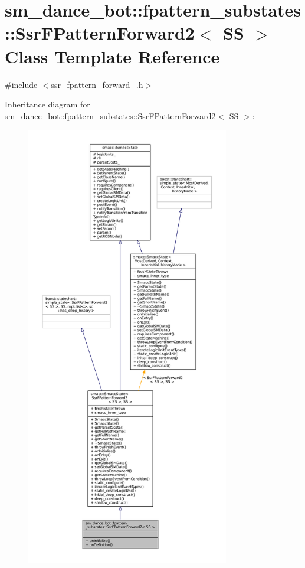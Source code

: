 \hypertarget{structsm__dance__bot_1_1fpattern__substates_1_1SsrFPatternForward2}{}\section{sm\+\_\+dance\+\_\+bot\+:\+:fpattern\+\_\+substates\+:\+:Ssr\+F\+Pattern\+Forward2$<$ SS $>$ Class Template Reference}
\label{structsm__dance__bot_1_1fpattern__substates_1_1SsrFPatternForward2}


{\ttfamily \#include $<$ssr\+\_\+fpattern\+\_\+forward\+\_.\+h$>$}



Inheritance diagram for sm\+\_\+dance\+\_\+bot\+:\+:fpattern\+\_\+substates\+:\+:Ssr\+F\+Pattern\+Forward2$<$ SS $>$\+:
\nopagebreak
\begin{figure}[H]
\begin{center}
\leavevmode
\includegraphics[height=550pt]{structsm__dance__bot_1_1fpattern__substates_1_1SsrFPatternForward2__inherit__graph}
\end{center}
\end{figure}


